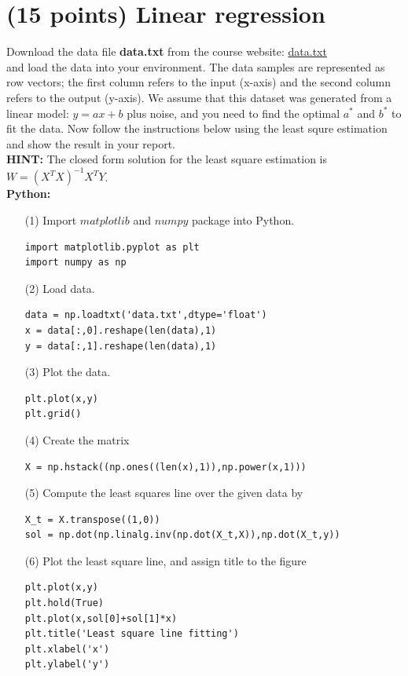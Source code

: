 \documentclass[12pt]{article}%
\begin{document}
\section{(15 points) Linear regression}
Download the data file \textbf{data.txt} from the course website: \href{}{data.txt}\\ and load the data into your environment. The data samples are represented as row vectors; the first column refers to the input (x-axis) and the second column refers to the output (y-axis). We assume that this dataset was generated from a linear model: $y=ax+b$ plus noise, and you need to find the optimal $a^*$ and $b^*$ to fit the data. Now follow the instructions below using the least squre estimation and show the result in your report. \\
\newline
\textbf{HINT:}
The closed form solution for the least square estimation is $W =(X^TX)^{-1}X^TY$.\\
\textbf{Python:}
\begin{enumerate}
\item[{(1)}] Import $matplotlib$ and $numpy$ package into Python.
\begin{verbatim}
import matplotlib.pyplot as plt
import numpy as np
\end{verbatim}
\item[{(2)}] Load data.
\begin{verbatim}
data = np.loadtxt('data.txt',dtype='float')
x = data[:,0].reshape(len(data),1)
y = data[:,1].reshape(len(data),1)
\end{verbatim}
\item[{(3)}] Plot the data.
\begin{verbatim}
plt.plot(x,y)
plt.grid()
\end{verbatim}
\item[{(4)}] Create the matrix
\begin{verbatim}
X = np.hstack((np.ones((len(x),1)),np.power(x,1)))
\end{verbatim}
\item[{(5)}] Compute the least squares line over the given data by
\begin{verbatim}
X_t = X.transpose((1,0))
sol = np.dot(np.linalg.inv(np.dot(X_t,X)),np.dot(X_t,y))
\end{verbatim}
\item[{(6)}] Plot the least square line, and assign title to the figure
\begin{verbatim}
plt.plot(x,y)
plt.hold(True)
plt.plot(x,sol[0]+sol[1]*x)
plt.title('Least square line fitting')
plt.xlabel('x')
plt.ylabel('y')
\end{verbatim}
\end{enumerate}
\end{document}

